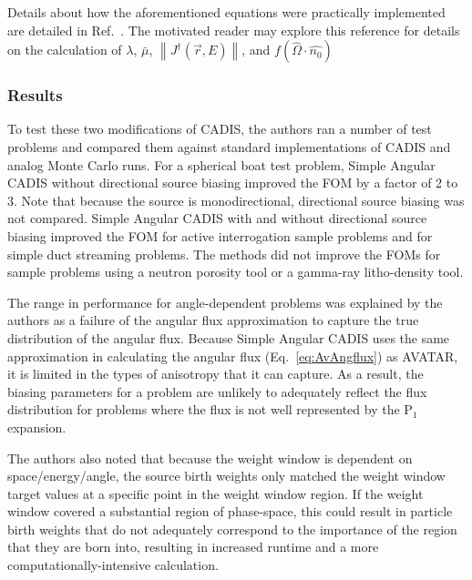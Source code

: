 Details about how the aforementioned equations were practically implemented are
detailed in Ref.\ \cite{peplow_consistent_2012}. The motivated reader may explore this
reference for details on the calculation of $\lambda$, $\bar{\mu}$,
$\left\| J^{\dagger}(\vec{r}, E)\right\|$, and $f(\hat\Omega \cdot \hat{n_0})$

\subsubsection*{Results}

To test these two modifications of CADIS, the authors ran a number of test
problems and
compared them against standard implementations of CADIS and analog Monte Carlo
runs. For a spherical boat test problem, Simple Angular CADIS without
directional source biasing improved the FOM by a factor of 2 to 3. Note that because
the source is monodirectional, directional source biasing was not compared.
Simple Angular CADIS with and without directional source biasing improved the
FOM for active interrogation sample problems and for simple duct streaming
problems. The methods did not improve the FOMs for sample problems using a neutron
porosity tool or a gamma-ray litho-density tool.

The range in performance for
angle-dependent problems was explained by the authors as a failure of the
angular flux approximation to capture the true distribution of the angular flux.
Because Simple Angular CADIS uses the same approximation in calculating the
angular flux (Eq.\ \eqref{eq:AvAngflux}) as AVATAR, it is limited in the types of anisotropy
that it can capture. As a result, the biasing parameters for a problem are unlikely to
adequately reflect the flux distribution for problems where the flux is not well represented by the P$_1$ expansion.

The authors also noted that because the weight window is dependent on
space/energy/angle, the source birth weights only matched
the weight window target values at a specific point in the weight window region.
If the weight window covered a substantial region of phase-space, this could
result in particle birth weights that do not adequately correspond to the
importance of the region that they are born into, resulting in increased runtime
and a more computationally-intensive calculation.

